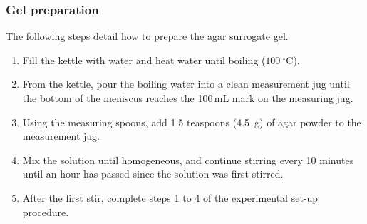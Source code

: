 \subsubsection*{Gel preparation}

The following steps detail how to prepare the agar surrogate gel.

\begin{enumerate}
    \item Fill the kettle with water and heat water until boiling ($100~^{\circ}$C).
    \item From the kettle, pour the boiling water into a clean measurement jug until the bottom of the meniscus reaches the 100\,mL mark on the measuring jug.
    \item Using the measuring spoons, add 1.5 teaspoons (4.5~g) of agar powder to the measurement jug. 
    \item Mix the solution until homogeneous, and continue stirring every 10 minutes until an hour has passed since the solution was first stirred. 
    \item After the first stir, complete steps 1 to 4 of the experimental set-up procedure.
\end{enumerate}

